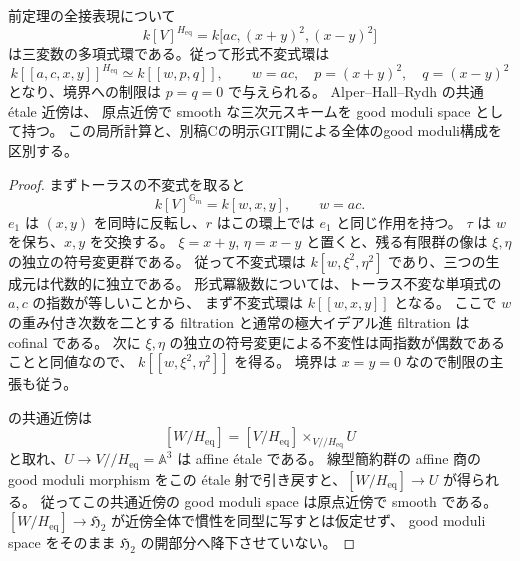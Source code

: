 \begin{corollary}
\label{cor:noncubic-coincident-polynomial-invariants}
前定理の全接表現について
\[
 k[V]^{H_{\mathrm{eq}}}
   =k\bigl[ac,(x+y)^2,(x-y)^2\bigr]
\]
は三変数の多項式環である。従って形式不変式環は
\[
 k[[a,c,x,y]]^{H_{\mathrm{eq}}}
   \simeq k[[w,p,q]],
 \qquad w=ac,\quad p=(x+y)^2,\quad q=(x-y)^2
\]
となり、境界への制限は $p=q=0$ で与えられる。
Alper--Hall--Rydh の共通 \texorpdfstring{\'etale}{etale} 近傍は、
原点近傍で smooth な三次元スキームを good moduli space として持つ。
この局所計算と、別稿Cの明示GIT開による全体のgood moduli構成を区別する。
\end{corollary}
\begin{proof}
まずトーラスの不変式を取ると
\[
 k[V]^{\mathbb G_m}=k[w,x,y],\qquad w=ac.
\]
$e_1$ は $(x,y)$ を同時に反転し、$r$ はこの環上では $e_1$ と同じ作用を持つ。
$\tau$ は $w$ を保ち、$x,y$ を交換する。
$\xi=x+y$, $\eta=x-y$ と置くと、残る有限群の像は
$\xi,\eta$ の独立の符号変更群である。
従って不変式環は $k[w,\xi^2,\eta^2]$ であり、三つの生成元は代数的に独立である。
形式冪級数については、トーラス不変な単項式の $a,c$ の指数が等しいことから、
まず不変式環は $k[[w,x,y]]$ となる。
ここで $w$ の重み付き次数を二とする filtration と通常の極大イデアル進 filtration は cofinal である。
次に $\xi,\eta$ の独立の符号変更による不変性は両指数が偶数であることと同値なので、
$k[[w,\xi^2,\eta^2]]$ を得る。
境界は $x=y=0$ なので制限の主張も従う。

\cite[Theorem 1.2]{AlperHallRydh2020} の共通近傍は
\[
 [W/H_{\mathrm{eq}}]
   =[V/H_{\mathrm{eq}}]\times_{V/\!/H_{\mathrm{eq}}}U
\]
と取れ、$U\to V/\!/H_{\mathrm{eq}}=\mathbb A^3$ は affine
\texorpdfstring{\'etale}{etale} である。
線型簡約群の affine 商の good moduli morphism をこの
\texorpdfstring{\'etale}{etale} 射で引き戻すと、$[W/H_{\mathrm{eq}}]\to U$ が得られる。
従ってこの共通近傍の good moduli space は原点近傍で smooth である。
$[W/H_{\mathrm{eq}}]\to\mathfrak H_2$ が近傍全体で慣性を同型に写すとは仮定せず、
good moduli space をそのまま $\mathfrak H_2$ の開部分へ降下させていない。
\end{proof}

